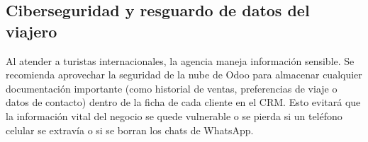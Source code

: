 \subsection{Ciberseguridad y resguardo de datos del viajero}
\begin{indentedsubsection}
Al atender a turistas internacionales, la agencia maneja información sensible. Se recomienda aprovechar la seguridad de la nube de Odoo para almacenar cualquier documentación importante (como historial de ventas, preferencias de viaje o datos de contacto) dentro de la ficha de cada cliente en el CRM. Esto evitará que la información vital del negocio se quede vulnerable o se pierda si un teléfono celular se extravía o si se borran los chats de WhatsApp.
\end{indentedsubsection}
